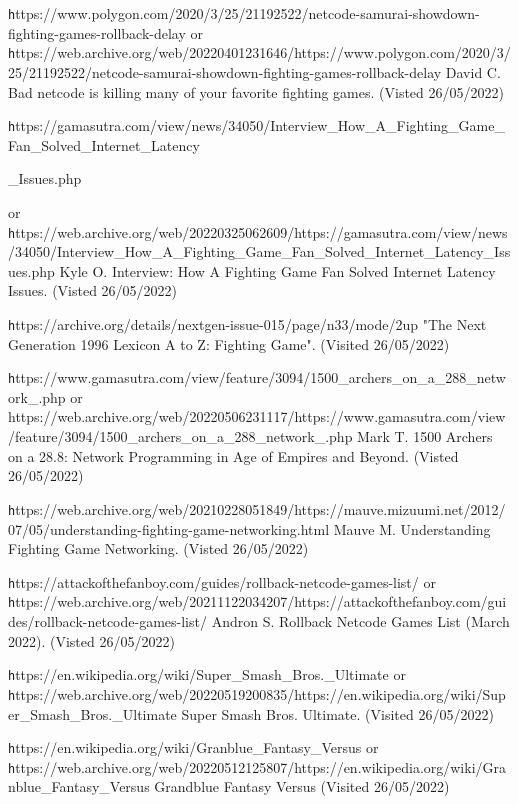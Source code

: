 \documentclass{entcs}
\begin{document}
\begin{thebibliography}{25}
 {\texttt https://www.polygon.com/2020/3/25/21192522/netcode-samurai-showdown-fighting-games-rollback-delay} or {\texttt https://web.archive.org/web/20220401231646/https://www.polygon.com/2020/3/25/21192522/netcode-samurai-showdown-fighting-games-rollback-delay} David C. Bad netcode is killing many of your favorite fighting
games. (Visted 26/05/2022)

 {\texttt https://gamasutra.com/view/news/34050/Interview\_How\_A\_Fighting\_Game\_Fan\_Solved\_Internet\_Latency

\_Issues.php} or {\texttt https://web.archive.org/web/20220325062609/https://gamasutra.com/view/news/34050/Interview\_How\_A\_Fighting\_Game\_Fan\_Solved\_Internet\_Latency\_Issues.php} Kyle O. Interview: How A Fighting Game Fan Solved Internet Latency Issues. (Visted 26/05/2022)

 {\texttt https://archive.org/details/nextgen-issue-015/page/n33/mode/2up} "The Next Generation 1996 Lexicon A to Z: Fighting Game". (Visited 26/05/2022)

 {\texttt https://www.gamasutra.com/view/feature/3094/1500\_archers\_on\_a\_288\_network\_.php} or {https://web.archive.org/web/20220506231117/https://www.gamasutra.com/view/feature/3094/1500\_archers\_on\_a\_288\_network\_.php} Mark T. 1500 Archers on a 28.8: Network Programming in Age of Empires and Beyond. (Visted 26/05/2022)

 {\texttt https://web.archive.org/web/20210228051849/https://mauve.mizuumi.net/2012/07/05/understanding-fighting-game-networking.html} Mauve M. Understanding Fighting Game Networking. (Visted 26/05/2022)

 {\texttt https://attackofthefanboy.com/guides/rollback-netcode-games-list/} or {\texttt https://web.archive.org/web/20211122034207/https://attackofthefanboy.com/guides/rollback-netcode-games-list/} Andron S. Rollback Netcode Games List (March 2022). (Visted 26/05/2022)

 {\texttt https://en.wikipedia.org/wiki/Super\_Smash\_Bros.\_Ultimate} or {\texttt https://web.archive.org/web/20220519200835/https://en.wikipedia.org/wiki/Super\_Smash\_Bros.\_Ultimate} Super Smash Bros. Ultimate. (Visited 26/05/2022)

 {\texttt https://en.wikipedia.org/wiki/Granblue\_Fantasy\_Versus} or {\texttt https://web.archive.org/web/20220512125807/https://en.wikipedia.org/wiki/Granblue\_Fantasy\_Versus} Grandblue Fantasy Versus (Visited 26/05/2022)


\end{thebibliography}
\end{document}
